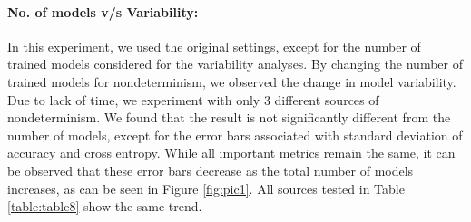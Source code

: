 \paragraph{No. of models v/s Variability:}
In this experiment, we used the original settings, except for the number of trained models considered for the variability analyses. By changing the number of trained models for nondeterminism, we observed the change in model variability. Due to lack of time, we experiment with only 3 different sources of nondeterminism. We found that the result is not significantly different from the number of models, except for the error bars associated with standard deviation of accuracy and cross entropy. While all important metrics remain the same, it can be observed that these error bars decrease as the total number of models increases, as can be seen in Figure \ref{fig:pic1}. All sources tested in Table \ref{table:table8} show the same trend.
